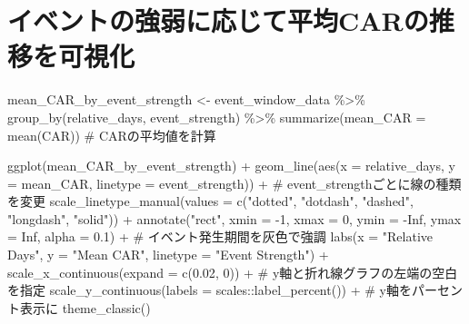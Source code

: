 \documentclass[
  letterpaper,
  DIV=11,
  numbers=noendperiod]{scrreprt}
\newenvironment{Shaded}{\begin{snugshade}}{\end{snugshade}}
\newcommand{\AttributeTok}[1]{\textcolor[rgb]{0.40,0.45,0.13}{#1}}
\newcommand{\CommentTok}[1]{\textcolor[rgb]{0.37,0.37,0.37}{#1}}
\newcommand{\ConstantTok}[1]{\textcolor[rgb]{0.56,0.35,0.01}{#1}}
\newcommand{\DecValTok}[1]{\textcolor[rgb]{0.68,0.00,0.00}{#1}}
\newcommand{\FloatTok}[1]{\textcolor[rgb]{0.68,0.00,0.00}{#1}}
\newcommand{\FunctionTok}[1]{\textcolor[rgb]{0.28,0.35,0.67}{#1}}
\newcommand{\NormalTok}[1]{\textcolor[rgb]{0.00,0.23,0.31}{#1}}
\newcommand{\OtherTok}[1]{\textcolor[rgb]{0.00,0.23,0.31}{#1}}
\newcommand{\SpecialCharTok}[1]{\textcolor[rgb]{0.37,0.37,0.37}{#1}}
\newcommand{\StringTok}[1]{\textcolor[rgb]{0.13,0.47,0.30}{#1}}
\begin{document}
\section{イベントの強弱に応じて平均CARの推移を可視化}\label{ux30a4ux30d9ux30f3ux30c8ux306eux5f37ux5f31ux306bux5fdcux3058ux3066ux5e73ux5747carux306eux63a8ux79fbux3092ux53efux8996ux5316}

\begin{Shaded}
\begin{Highlighting}[]
\NormalTok{mean\_CAR\_by\_event\_strength }\OtherTok{\textless{}{-}}\NormalTok{ event\_window\_data }\SpecialCharTok{\%\textgreater{}\%}
  \FunctionTok{group\_by}\NormalTok{(relative\_days, event\_strength) }\SpecialCharTok{\%\textgreater{}\%}
  \FunctionTok{summarize}\NormalTok{(}\AttributeTok{mean\_CAR =} \FunctionTok{mean}\NormalTok{(CAR)) }\CommentTok{\# CARの平均値を計算}

\FunctionTok{ggplot}\NormalTok{(mean\_CAR\_by\_event\_strength) }\SpecialCharTok{+}
  \FunctionTok{geom\_line}\NormalTok{(}\FunctionTok{aes}\NormalTok{(}\AttributeTok{x =}\NormalTok{ relative\_days, }\AttributeTok{y =}\NormalTok{ mean\_CAR, }\AttributeTok{linetype =}\NormalTok{ event\_strength)) }\SpecialCharTok{+} \CommentTok{\# event\_strengthごとに線の種類を変更}
  \FunctionTok{scale\_linetype\_manual}\NormalTok{(}\AttributeTok{values =} \FunctionTok{c}\NormalTok{(}\StringTok{"dotted"}\NormalTok{, }\StringTok{"dotdash"}\NormalTok{, }\StringTok{"dashed"}\NormalTok{, }\StringTok{"longdash"}\NormalTok{, }\StringTok{"solid"}\NormalTok{)) }\SpecialCharTok{+}
  \FunctionTok{annotate}\NormalTok{(}\StringTok{"rect"}\NormalTok{, }\AttributeTok{xmin =} \SpecialCharTok{{-}}\DecValTok{1}\NormalTok{, }\AttributeTok{xmax =} \DecValTok{0}\NormalTok{, }\AttributeTok{ymin =} \SpecialCharTok{{-}}\ConstantTok{Inf}\NormalTok{, }\AttributeTok{ymax =} \ConstantTok{Inf}\NormalTok{, }\AttributeTok{alpha =} \FloatTok{0.1}\NormalTok{) }\SpecialCharTok{+} \CommentTok{\# イベント発生期間を灰色で強調}
  \FunctionTok{labs}\NormalTok{(}\AttributeTok{x =} \StringTok{"Relative Days"}\NormalTok{, }\AttributeTok{y =} \StringTok{"Mean CAR"}\NormalTok{, }\AttributeTok{linetype =} \StringTok{"Event Strength"}\NormalTok{) }\SpecialCharTok{+} 
  \FunctionTok{scale\_x\_continuous}\NormalTok{(}\AttributeTok{expand =} \FunctionTok{c}\NormalTok{(}\FloatTok{0.02}\NormalTok{, }\DecValTok{0}\NormalTok{)) }\SpecialCharTok{+} \CommentTok{\# y軸と折れ線グラフの左端の空白を指定}
  \FunctionTok{scale\_y\_continuous}\NormalTok{(}\AttributeTok{labels =}\NormalTok{ scales}\SpecialCharTok{::}\FunctionTok{label\_percent}\NormalTok{()) }\SpecialCharTok{+} \CommentTok{\# y軸をパーセント表示に}
  \FunctionTok{theme\_classic}\NormalTok{()}
\end{Highlighting}
\end{Shaded}
\end{document}
